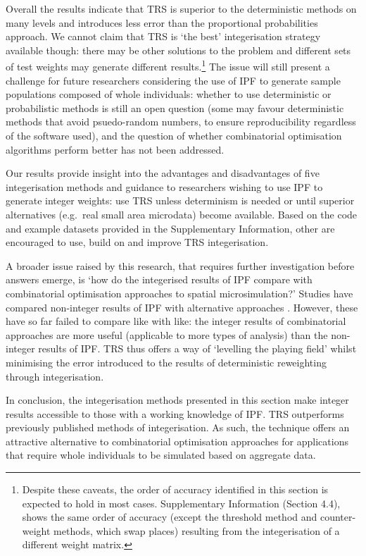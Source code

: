 \documentclass[a4paper, 11pt, twoside]{Thesis}
\begin{document}
Overall the results indicate that TRS is superior to the
deterministic methods on many levels and introduces less error than the
proportional probabilities approach.
We cannot claim that TRS is `the best' integerisation strategy available though:
there may be other solutions to the problem and different sets of test weights
may generate different
results.\footnote{Despite these caveats, the order of accuracy
identified in this section is expected to hold in most cases.
Supplementary Information (Section 4.4), shows the same order of
accuracy (except the threshold method and counter-weight
methods, which swap places) resulting from the integerisation of a
different weight matrix.
}
The issue will still present a
challenge for future researchers considering the use of IPF to generate sample
populations composed of whole individuals: whether to use deterministic or
probabilistic methods is still an open question (some may favour
deterministic methods that avoid psuedo-random numbers, to ensure
reproducibility regardless of the software used), and the question of whether
combinatorial optimisation algorithms perform better has not been addressed.

Our results provide insight into the advantages and disadvantages of
five integerisation methods and guidance to researchers wishing to
use IPF to generate integer weights: use
TRS unless determinism is needed or until superior alternatives (e.g.~real small
area microdata) become available. Based on the code and example datasets
provided in the Supplementary Information, other are encouraged to use, build on
and improve TRS integerisation.

A broader issue raised by this research, that requires further
investigation before answers emerge, is `how do the integerised results of IPF
compare with combinatorial optimisation approaches to spatial microsimulation?'
Studies have compared non-integer results of IPF with
alternative approaches \citep{Smith2009, Ryan2009, Rahman2010, harland2012}.
However, these have so far failed to compare like with like: the integer results
of combinatorial approaches are more useful (applicable to more types of
analysis) than the non-integer results of IPF. TRS thus offers a
way of `levelling the playing field' whilst minimising the error introduced to
the results of deterministic reweighting through integerisation.

In conclusion, the integerisation methods presented in this section make
integer results accessible to those with a working knowledge of IPF. TRS
outperforms previously published methods of integerisation. As such, the
technique offers an attractive alternative to combinatorial
optimisation approaches for applications that
require whole individuals to be simulated based on aggregate data.
\end{document}
